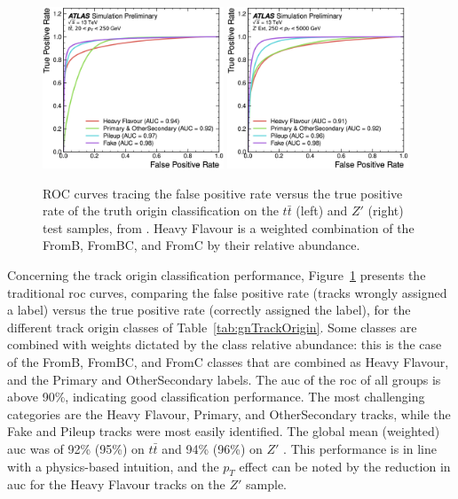\begin{figure}[h!]
  \centering
  \includegraphics[width=0.48\textwidth]{Images/FTAG/GN/GN1/ablations/ttroc.png}
  \includegraphics[width=0.48\textwidth]{Images/FTAG/GN/GN1/ablations/zproc.png}
  \caption{ROC curves tracing the false positive rate versus the true positive rate of the truth origin classification on the $t\bar{t}$ (left) and $Z'$ (right) test samples, from \cite{ATL-PHYS-PUB-2022-027}. Heavy Flavour is a weighted combination of the FromB, FromBC, and FromC by their relative abundance.}
  \label{fig:GN1trackperf}
\end{figure} 

Concerning the track origin classification performance, Figure~\ref{fig:GN1trackperf} presents the traditional \gls{roc} curves, comparing the false positive rate (tracks wrongly assigned a label) versus the true positive rate (correctly assigned the label), for the different track origin classes of Table~\ref{tab:gnTrackOrigin}. Some classes are combined with weights dictated by the class relative abundance: this is the case of the FromB, FromBC, and FromC classes that are combined as Heavy Flavour, and the Primary and OtherSecondary labels. The \gls{auc} of the \gls{roc} of all groups is above 90\%, indicating good classification performance. The most challenging categories are the Heavy Flavour, Primary, and OtherSecondary tracks, while the Fake and Pileup tracks were most easily identified. The global mean (weighted) \gls{auc} was of 92\% (95\%) on $t\bar{t}$ and 94\% (96\%) on $Z'$ \cite{ATL-PHYS-PUB-2022-027}. This performance is in line with a physics-based intuition, and the $p_T$ effect can be noted by the reduction in \gls{auc} for the Heavy Flavour tracks on the $Z'$ sample. \\

